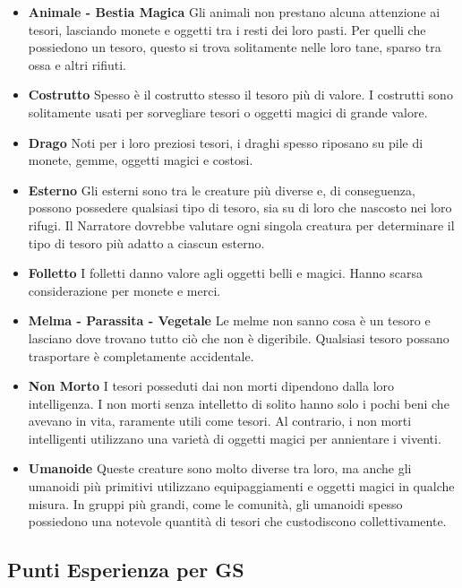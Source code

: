 \begin{multicols}{2}
\begin{itemize}[leftmargin=*]
	\item \textbf{Animale - Bestia Magica} Gli animali non prestano alcuna attenzione ai tesori, lasciando monete e oggetti tra i resti dei loro pasti. Per quelli che possiedono un tesoro, questo si trova solitamente nelle loro tane, sparso tra ossa e altri rifiuti.

	\item \textbf{Costrutto}
	Spesso è il costrutto stesso il tesoro più di valore. I costrutti sono solitamente usati per sorvegliare tesori o oggetti magici di grande valore.

	\item \textbf{Drago}
	Noti per i loro preziosi tesori, i draghi spesso riposano su pile di monete, gemme, oggetti magici e costosi.

	\item \textbf{Esterno}
	Gli esterni sono tra le creature più diverse e, di conseguenza, possono possedere qualsiasi tipo di tesoro, sia su di loro che nascosto nei loro rifugi. Il Narratore dovrebbe valutare ogni singola creatura per determinare il tipo di tesoro più adatto a ciascun esterno.

	\item \textbf{Folletto}
	I folletti danno valore agli oggetti belli e magici. Hanno scarsa considerazione per monete e merci.

	\item \textbf{Melma - Parassita - Vegetale}
	Le melme non sanno cosa è un tesoro e lasciano dove trovano tutto ciò che non è digeribile. Qualsiasi tesoro possano trasportare è completamente accidentale.

	\item \textbf{Non Morto}
	I tesori posseduti dai non morti dipendono dalla loro intelligenza. I non morti senza intelletto di solito hanno solo i pochi beni che avevano in vita, raramente utili come tesori. Al contrario, i non morti intelligenti utilizzano una varietà di oggetti magici per annientare i viventi.

	\item \textbf{Umanoide}
	Queste creature sono molto diverse tra loro, ma anche gli umanoidi più primitivi utilizzano equipaggiamenti e oggetti magici in qualche misura. In gruppi più grandi, come le comunità, gli umanoidi spesso possiedono una notevole quantità di tesori che custodiscono collettivamente.

\end{itemize}


\subsection{Punti Esperienza per GS}


\end{multicols}
